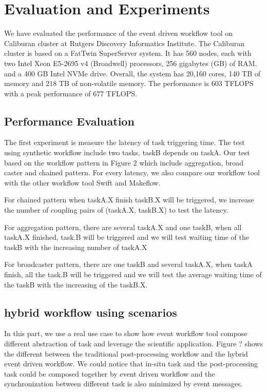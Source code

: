 \section{Evaluation and Experiments}
We have evaluated the performance of the event driven workflow tool on Caliburan cluster at Rutgers Discovery Informatics Institute. The Caliburan cluster is based on a FatTwin SuperServer system. It has 560 nodes, each with two Intel Xeon E5-2695 v4 (Broadwell) processors, 256 gigabytes (GB) of RAM, and a 400 GB Intel NVMe drive. Overall, the system has 20,160 cores, 140 TB of memory and 218 TB of non-volatile memory. The performance is 603 TFLOPS with a peak performance of 677 TFLOPS\cite{caliburn}.

\subsection{Performance Evaluation}
The first experiment is measure the latency of task triggering time. The test using synthetic workflow include two tasks, taskB depends on taskA. Our test based on the workflow pattern in Figure 2 which include aggregation, broad caster and chained pattern. For every latency, we also compare our workflow tool with the other workflow tool Swift\cite{wilde2011swift} and Makeflow\cite{albrecht2012makeflow}.

For chained pattern when taskA.X finish taskB.X will be triggered, we increase the number of coupling pairs of (taskA.X, taskB.X) to test the latency.

For aggregation pattern, there are several taskA.X and one taskB, when all taskA.X finished, task.B will be triggered and we will test waiting time of the taskB with the increasing number of taskA.X

For broadcaster pattern, there are one taskB and several taskA.X, when taskA finish, all the task.B will be triggered and we will test the average waiting time of the taskB with the increasing of the taskB.X.

\subsection{hybrid workflow using scenarios}
In this part, we use a real use case to show how event workflow tool compose different abstraction of task and leverage the scientific application.
Figure ? shows the different between the traditional post-processing workflow and the hybrid event driven workflow. We could notice that in-situ task and the post-processing task could be composed together by event driven workflow and the synchronization between different task is also minimized by event messages.

